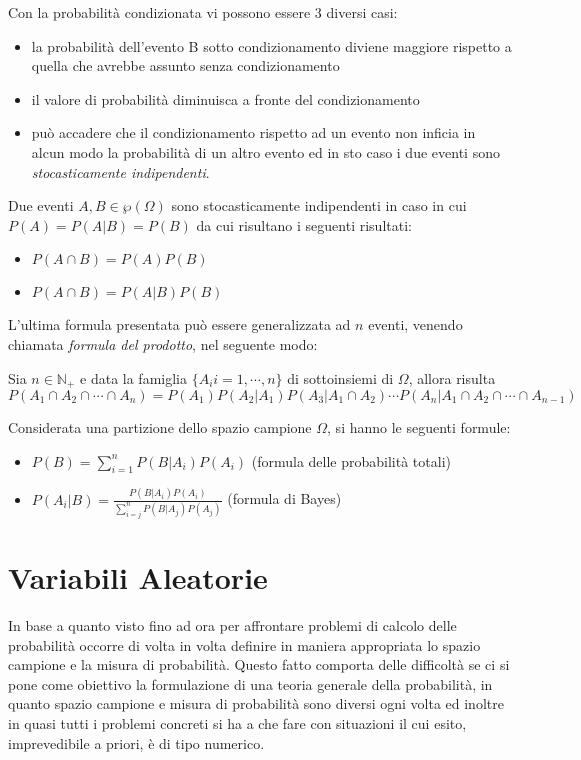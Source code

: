 \documentclass[a4paper,12pt, oneside]{book}
\newcommand{\numberset}{\mathbb}
\newcommand{\N}{\numberset{N}}
\begin{document}
Con la probabilità condizionata vi possono essere 3 diversi casi:
\begin{itemize}
    \item la probabilità dell’evento B sotto condizionamento diviene maggiore rispetto a quella 
          che avrebbe assunto senza condizionamento
    \item il valore di probabilità diminuisca a fronte del condizionamento
    \item può accadere che il condizionamento rispetto ad un evento non inficia in alcun modo la probabilità di 
        un altro evento ed in sto caso i due eventi sono \emph{stocasticamente indipendenti}.
\end{itemize}
Due eventi $A, B \in \wp(\Omega)$ sono stocasticamente indipendenti in caso in cui $P(A) = P(A | B) = P(B)$
da cui risultano i seguenti risultati:
\begin{itemize}
    \item $P(A \cap B) = P(A) P(B)$
    \item $P(A \cap B) = P(A | B) P(B)$
\end{itemize}
L'ultima formula presentata può essere generalizzata ad $n$ eventi, venendo chiamata 
\emph{formula del prodotto}, nel seguente modo:
\begin{definizione}
    Sia $n \in \N _+$ e data la famiglia $\{A_i i=1, \cdots, n\}$ di sottoinsiemi di $\Omega$, allora risulta
    \[P(A_1 \cap A_2 \cap \cdots \cap A_n) = P(A_1) P(A_2 | A_1) P(A_3 | A_1 \cap A_2) \cdots 
                                             P(A_n | A_1 \cap A_2 \cap \cdots \cap A_{n-1}) \]
\end{definizione}
Considerata una partizione dello spazio campione $\Omega$, si hanno le seguenti formule:
\begin{itemize}
    \item $P(B) = \sum_{i = 1} ^ n P(B | A_i) P(A_i)$ (formula delle probabilità totali)
    \item $P(A_i | B) = \frac{P(B | A_i) P(A_i)}{\sum_{i = j} ^ n P(B | A_j) P(A_j)}$ (formula di Bayes)
\end{itemize}

\section{Variabili Aleatorie}
In base a quanto visto fino ad ora per affrontare problemi di calcolo delle probabilità occorre di volta
in volta definire in maniera appropriata lo spazio campione e la misura di probabilità.\newline
Questo fatto comporta delle difficoltà se ci si pone come obiettivo la formulazione di una teoria
generale della probabilità, in quanto spazio campione e misura di probabilità sono diversi ogni volta ed
inoltre in quasi tutti i problemi concreti si ha a che fare con situazioni il cui esito, 
imprevedibile a priori, è di tipo numerico.
\end{document}
